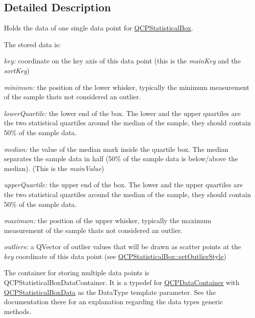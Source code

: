 \subsection{Detailed Description}
Holds the data of one single data point for \hyperlink{classQCPStatisticalBox}{Q\+C\+P\+Statistical\+Box}. 

The stored data is\+:

\begin{DoxyItemize}
\item {\itshape key\+:} coordinate on the key axis of this data point (this is the {\itshape main\+Key} and the {\itshape sort\+Key})\end{DoxyItemize}
\begin{DoxyItemize}
\item {\itshape minimum\+:} the position of the lower whisker, typically the minimum measurement of the sample that\textquotesingle{}s not considered an outlier.\end{DoxyItemize}
\begin{DoxyItemize}
\item {\itshape lower\+Quartile\+:} the lower end of the box. The lower and the upper quartiles are the two statistical quartiles around the median of the sample, they should contain 50\% of the sample data.\end{DoxyItemize}
\begin{DoxyItemize}
\item {\itshape median\+:} the value of the median mark inside the quartile box. The median separates the sample data in half (50\% of the sample data is below/above the median). (This is the {\itshape main\+Value})\end{DoxyItemize}
\begin{DoxyItemize}
\item {\itshape upper\+Quartile\+:} the upper end of the box. The lower and the upper quartiles are the two statistical quartiles around the median of the sample, they should contain 50\% of the sample data.\end{DoxyItemize}
\begin{DoxyItemize}
\item {\itshape maximum\+:} the position of the upper whisker, typically the maximum measurement of the sample that\textquotesingle{}s not considered an outlier.\end{DoxyItemize}
\begin{DoxyItemize}
\item {\itshape outliers\+:} a Q\+Vector of outlier values that will be drawn as scatter points at the {\itshape key} coordinate of this data point (see \hyperlink{classQCPStatisticalBox_ad5241943422eb8e58360a97e99ad6aa7}{Q\+C\+P\+Statistical\+Box\+::set\+Outlier\+Style})\end{DoxyItemize}
The container for storing multiple data points is Q\+C\+P\+Statistical\+Box\+Data\+Container. It is a typedef for \hyperlink{classQCPDataContainer}{Q\+C\+P\+Data\+Container} with \hyperlink{classQCPStatisticalBoxData}{Q\+C\+P\+Statistical\+Box\+Data} as the Data\+Type template parameter. See the documentation there for an explanation regarding the data type\textquotesingle{}s generic methods.

